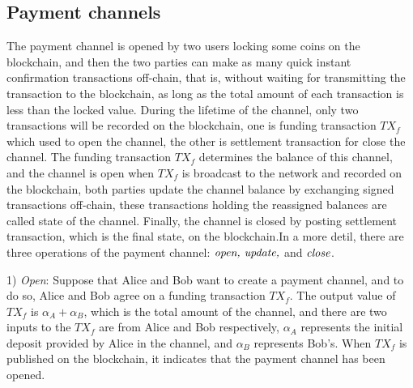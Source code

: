 \documentclass[conference]{IEEEtran}
\begin{document}
\subsection{Payment channels}

The payment channel is opened by two users locking some coins on the blockchain, and then the two parties can make as many quick 
instant confirmation transactions off-chain, that is, without waiting for transmitting the transaction to the blockchain, as long 
as the total amount of each transaction is less than the locked value. During the lifetime of the channel, only two transactions 
will be recorded on the blockchain, one is funding transaction $TX_f$ which used to open the channel, the other is settlement 
transaction for close the channel. The funding transaction $TX_f$ determines the balance of this channel, and the channel is open 
when $TX_f$ is broadcast to the network and recorded on the blockchain, both parties update the channel balance by exchanging signed 
transactions off-chain, these transactions holding the reassigned balances are called state of the channel. Finally, the 
channel is closed by posting settlement transaction, which is the final state, on the blockchain.In a more detil, there are three 
operations of the payment channel: $\emph{open, update,}$ and  $\emph{close}$.

1) \emph{Open}: Suppose that Alice and Bob want to create a payment channel, and to do so, Alice and Bob agree on a funding
transaction $TX_f$. The output value of $TX_f$ is $\alpha_A+\alpha_B$, which is the total amount of the channel, and there are two inputs 
to the $TX_f$ are from Alice and Bob respectively, $\alpha_A$ represents the initial deposit provided by Alice in the channel, and 
$\alpha_B$ represents Bob's. When $TX_f$ is published on the blockchain, it indicates that the payment channel has been opened.
\end{document}
